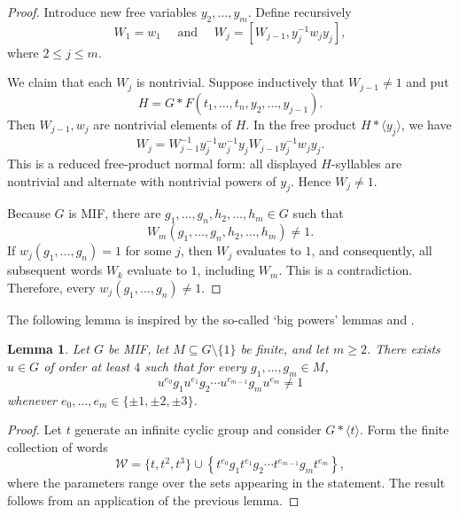 \documentclass[11pt]{article}
\newtheorem{lem}[thm]{Lemma}
\theoremstyle{definition}
\theoremstyle{remark}
\numberwithin{equation}{section}
\numberwithin{equation}{section}
\numberwithin{equation}{section}
\begin{document}
\begin{proof}
Introduce new free variables $y_2,\ldots,y_m$. Define recursively
$$
W_1=w_1\quad\text{ and }\quad W_j=[W_{j-1},y_j^{-1}w_jy_j],
$$
where $2\leq j\leq m$.

We claim that each $W_j$ is nontrivial. Suppose inductively that
$W_{j-1}\neq1$ and put
$$
H=G*F(t_1,\ldots,t_n,y_2,\ldots,y_{j-1}).
$$
Then $W_{j-1},w_j$ are nontrivial elements of $H$. In the free product $H*\langle y_j\rangle$, we have
$$
W_j
=
W_{j-1}^{-1}y_j^{-1}w_j^{-1}y_j
W_{j-1}y_j^{-1}w_jy_j.
$$
This is a reduced free-product normal form: all displayed $H$-syllables are
nontrivial and alternate with nontrivial powers of $y_j$. Hence
$W_j\neq1$.

Because $G$ is MIF, there are $g_1,\ldots,g_n,h_2,\ldots,h_m\in G$ such that
$$
W_m(g_1,\ldots,g_n,h_2,\ldots,h_m)\neq1.
$$
If $w_j(g_1,\ldots,g_n)=1$ for some $j$, then $W_j$ evaluates to $1$, and consequently, all subsequent words $W_k$ evaluate to $1$, including $W_m$. This is a contradiction. Therefore, every $w_j(g_1,\ldots,g_n)\neq1$.
\end{proof}

The following lemma is inspired by the so-called `big powers' lemmas \cite[Theorem 4]{So18} and \cite[Lemma 3.3]{AbDa19}. 

\begin{lem}\label{bigpowers}
    Let $G$ be MIF, let $M\subseteq G\setminus\{1\}$ be finite, and let
$m\geq2$. There exists $u\in G$ of order at least $4$ such that for every $g_1,\ldots,g_m\in M$,
$$
u^{e_0}g_1u^{e_1}g_2\cdots u^{e_{m-1}}g_mu^{e_m}\neq1
$$
whenever $e_0,\ldots,e_m\in\{\pm1,\pm2,\pm3\}$.
\end{lem}



\begin{proof}
Let $t$ generate an infinite cyclic group and consider $G*\langle t\rangle$. Form the finite collection of words
$$
\mathcal W=\{t,t^2, t^3\}\cup\left\{ t^{e_0}g_1t^{e_1}g_2\cdots t^{e_{m-1}}g_mt^{e_m}\right\},
$$
where the parameters range over the sets appearing in the statement. The result follows from an application of the previous lemma.
\end{proof}
\end{document}
